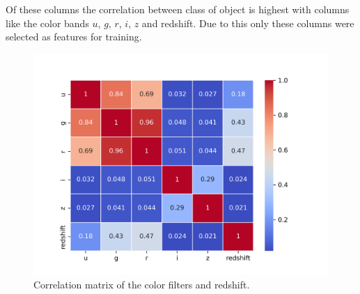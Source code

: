 Of these columns the correlation between class of object is highest with columns like the color bands $u$, $g$, $r$, $i$, $z$ and redshift. Due to this only these columns were selected as features for training. 

\begin{figure}[H]
    \centering
    \includegraphics[scale=1]{images/CorrelationMatrix.png}
    \caption{Correlation matrix of the color filters and redshift.}
    \label{fig:corr}
\end{figure}


